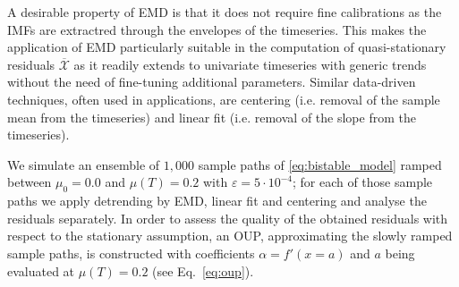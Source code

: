 \documentclass[a4paper,fleqn]{cas-sc}
\begin{document}
A desirable property of EMD is that it does not require fine calibrations as the IMFs are extractred through the envelopes of the timeseries.
This makes the application of EMD particularly suitable in the computation of quasi-stationary residuals $\overline{\mathcal{X}}$ as it readily extends to univariate timeseries with generic trends without the need of fine-tuning additional parameters.
Similar data-driven techniques, often used in applications, are centering (i.e. removal of the sample mean from the timeseries) and linear fit (i.e. removal of the slope from the timeseries).

We simulate an ensemble of $1{,}000$ sample paths of \eqref{eq:bistable_model} ramped between $\mu_0=0.0$ and $\mu(T)=0.2$ with $\varepsilon=5\cdot10^{-4}$; for each of those sample paths we apply detrending by EMD, linear fit and centering and analyse the residuals separately.
In order to assess the quality of the obtained residuals with respect to the stationary assumption, an OUP, approximating the slowly ramped sample paths, is constructed with coefficients $\alpha=f'(x=a)$ and $a$ being evaluated at $\mu(T)=0.2$ (see Eq.~\eqref{eq:oup}).
\end{document}
